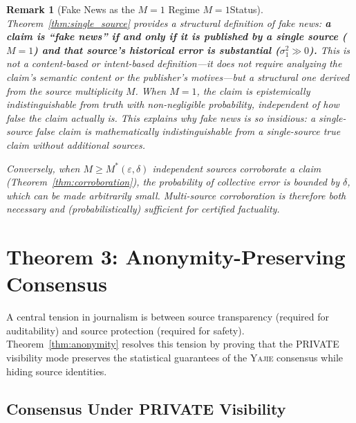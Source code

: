 \documentclass[11pt,a4paper]{article}
\newtheorem{remark}[theorem]{Remark}
\theoremstyle{definition}
\newcommand{\Yajie}{\textsc{Yajie}}
\newcommand{\VISprivate}{\textsc{PRIVATE}}
\begin{document}
\begin{remark}[Fake News as the $M=1$ Regime $M=1$Status]
Theorem~\ref{thm:single_source} provides a structural definition of fake news: \textbf{a claim is ``fake news'' if and only if it is published by a single source ($M = 1$) and that source's historical error is substantial ($\sigma_1^2 \gg 0$).} This is not a content-based or intent-based definition---it does not require analyzing the claim's semantic content or the publisher's motives---but a structural one derived from the source multiplicity $M$. When $M = 1$, the claim is \textit{epistemically indistinguishable} from truth with non-negligible probability, independent of how false the claim actually is. This explains why fake news is so insidious: a single-source false claim is mathematically indistinguishable from a single-source true claim without additional sources.

Conversely, when $M \geq M^*(\varepsilon, \delta)$ independent sources corroborate a claim (Theorem~\ref{thm:corroboration}), the probability of collective error is bounded by $\delta$, which can be made arbitrarily small. Multi-source corroboration is therefore both necessary and (probabilistically) sufficient for certified factuality.
\end{remark}

\section{Theorem 3: Anonymity-Preserving Consensus }
\label{sec:anonymity}

A central tension in journalism is between source transparency (required for auditability) and source protection (required for safety). Theorem~\ref{thm:anonymity} resolves this tension by proving that the \VISprivate{} visibility mode preserves the statistical guarantees of the \Yajie{} consensus while hiding source identities.

\subsection{Consensus Under PRIVATE Visibility}
\end{document}
